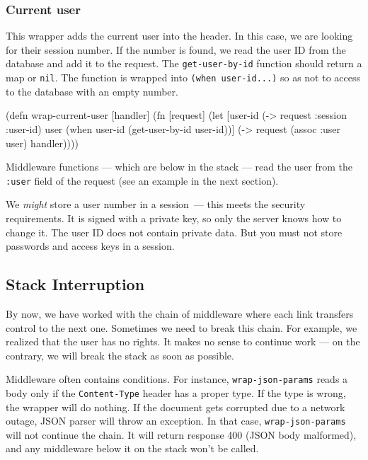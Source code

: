\subsubsection*{Current user}


This wrapper adds the current user into the header. In this case, we are looking for their session number. If the number is found, we read the user ID from the database and add it to the request. The \verb|get-user-by-id| function should return a map or \verb|nil|. The function is wrapped into \verb|(when user-id...)| so as not to access to the database with an empty number.


\begin{english}
\begin{clojure}
(defn wrap-current-user [handler]
(fn [request]
(let [user-id (-> request :session :user-id)
user (when user-id
(get-user-by-id user-id))]
(-> request
(assoc :user user)
handler))))
\end{clojure}
\end{english}


Middleware functions — which are below in the stack — read the user from the \verb|:user| field of the request (see an example in the next section).

We \emph{might} store a user number in a session~--- this meets the security requirements. It is signed with a private key, so only the server knows how to change it. The user ID does not contain private data. But you must not store passwords and access keys in a session.

\subsection{Stack Interruption}


By now, we have worked with the chain of middleware where each link transfers control to the next one. Sometimes we need to break this chain. For example, we realized that the user has no rights. It makes no sense to continue work — on the contrary, we will break the stack as soon as possible.


Middleware often contains conditions. For instance, \verb|wrap-json-params| reads a body only if the \verb|Content-Type| header has a proper type. If the type is wrong, the wrapper will do nothing. If the document gets corrupted due to a network outage, JSON parser will throw an exception. In that case, \verb|wrap-json-params| will not continue the chain. It will return response 400 (JSON body malformed), and any middleware below it on the stack won't be called.

